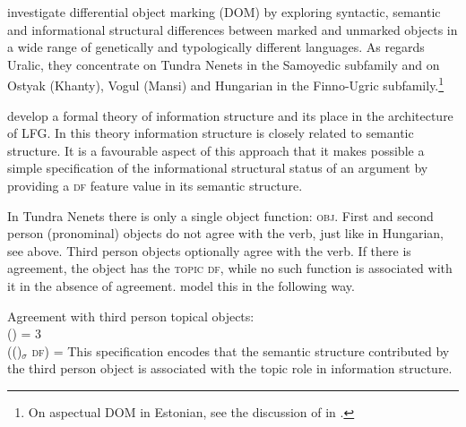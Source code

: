 \documentclass[output=paper,hidelinks]{langscibook}
\begin{document}
\ea%
    \label{ex:FinnoUgric:65}
\z

\hspace*{-1mm}\citet{DN} investigate differential object marking (DOM) by exploring syntactic, semantic and informational structural differences between marked and unmarked objects in a wide range of genetically and typologically different languages. As regards Uralic, they concentrate on Tundra Nenets in the Samoyedic subfamily and on Ostyak (Khanty), Vogul (Mansi) and Hungarian in the Finno-Ugric subfamily.\footnote{On aspectual DOM in Estonian, see the discussion of \citet{Tamm2006} in .}

\citet{DN} develop a formal theory of information structure and its place in the architecture of LFG. In this theory information structure is closely related to semantic structure. It is a favourable aspect of this approach that it makes possible a simple specification of the informational structural status of an argument by providing a \textsc{df} feature value in its semantic structure. 

In Tundra Nenets there is only a single object function: \textsc{obj}. First and second person (pronominal) objects do not agree with the verb, just like in Hungarian, see  above. Third person objects optionally agree with the verb. If there is agreement, the object has the \textsc{topic} \textsc{df}, while no such function is associated with it in the absence of agreement. \citet{DN} model this in the following way.

\ea%
    \label{ex:FinnoUgric:66}Agreement with third person topical
    objects:\\[1ex]
    (\UP\OBJ\PERS) = 3\\
    ((\UP\OBJ)$_\sigma$ \textsc{df}) = \TOPIC
    \z
This specification encodes that the semantic structure contributed by the third person object is associated with the topic role in information structure.
\end{document}
